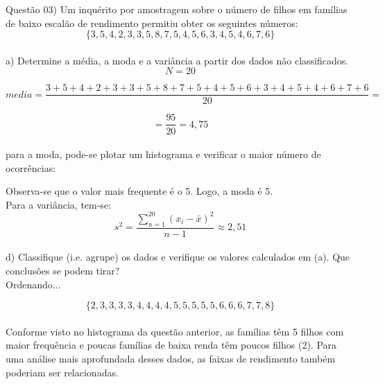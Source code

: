
\noindent \textcolor{COLOR1}{Questão 03)} Um inquérito por amostragem sobre o número de filhos em famílias de baixo escalão de
rendimento permitiu obter os seguintes números:
\\

\[
    \{ 3, 5, 4, 2, 3, 3, 5, 8, 7, 5, 4, 5, 6, 3, 4, 5, 4, 6, 7, 6\}
\]
\\

a) Determine a média, a moda e a variância a partir dos dados não classificados.
\\

\[N=20\]

\[
    media = \frac{3+5+4+2+3+3+5+8+7+5+4+5+6+3+4+5+4+6+7+6}{20} =
\]

\[
    =\frac{95}{20} = 4,75
\]
\\

para a moda, pode-se plotar um histograma e verificar o maior número de ocorrências:



Observa-se que o valor mais frequente é o 5. Logo, a moda é 5.
\\

Para a variância, tem-se:
\\

\[
    s^2 = \frac{\sum_{n = 1}^{20} \left(x_i-\bar{x}\right)^2}{n-1} \approx 2,51
\]
\\

d) Classifique (i.e. agrupe) os dados e verifique os valores calculados em (a). Que conclusões se podem tirar?
\\

Ordenando...

\[
    \{ 2,3,3,3,3,4,4,4,4,5,5,5,5,5,6,6,6,7,7,8\}
\]
\\

Conforme visto no histograma da questão anterior, as famílias têm 5 filhos com maior frequência e poucas famílias de baixa renda têm poucos filhos (2). Para uma análise mais aprofundada desses dados, as faixas de rendimento também poderiam ser relacionadas.
\\

